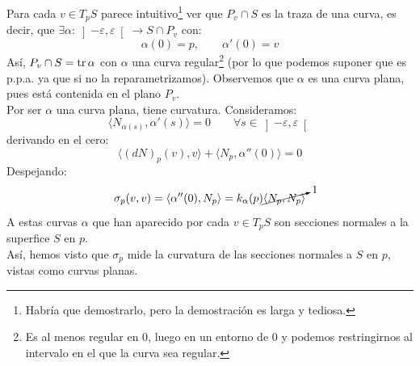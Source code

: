 \noindent
Para cada $v\in T_pS$ parece intuitivo\footnote{Habría que demostrarlo, pero la demostración es larga y tediosa.} ver que $P_v\cap S$ es la traza de una curva, es decir, que $\exists \alpha:\left]-\varepsilon,\varepsilon\right[\to S\cap P_v$ con:
\begin{equation*}
    \alpha(0) = p, \qquad \alpha'(0) = v
\end{equation*}
Así, $P_v\cap S=\operatorname{tr} \alpha$ con $\alpha$ una curva regular\footnote{Es al menos regular en $0$, luego en un entorno de $0$ y podemos restringirnos al intervalo en el que la curva sea regular.} (por lo que podemos suponer que es p.p.a. ya que si no la reparametrizamos). Observemos que $\alpha$ es una curva plana, pues está contenida en el plano $P_v$.\\

\noindent
Por ser $\alpha$ una curva plana, tiene curvatura. Consideramos:
\begin{equation*}
    \langle N_{\alpha(s)},\alpha'(s) \rangle = 0 \qquad \forall s\in \left]-\varepsilon,\varepsilon\right[
\end{equation*}
derivando en el cero:
\begin{equation*}
    \langle (dN)_p(v),v \rangle + \langle N_p, \alpha''(0) \rangle = 0
\end{equation*}
Despejando:
\begin{equation*}
    \sigma_p(v,v) = \langle \alpha''(0),N_p \rangle = k_\alpha(p) \cancelto{1}{\langle N_p,N_p \rangle} 
\end{equation*}
A estas curvas $\alpha$ que han aparecido por cada $v\in T_pS$ son secciones normales a la superfice $S$ en $p$.\\

\noindent
Así, hemos visto que $\sigma_p$ mide la curvatura de las secciones normales a $S$ en $p$, vistas como curvas planas.

